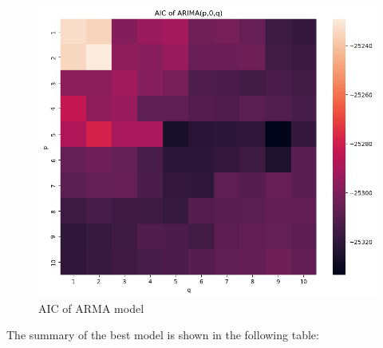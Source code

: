 \documentclass[runningheads]{llncs}
\begin{document}
\begin{figure}[htbp]
    \centering
    \includegraphics[width=\textwidth]{../img/aic.png}
    \caption{AIC of ARMA model}
    \label{fig:5}
\end{figure}

The summary of the best model is shown in the following table:
\end{document}
